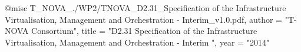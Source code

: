 @misc{ T_NOVA_./WP2/TNOVA_D2.31_Specification of the Infrastructure Virtualisation, Management and Orchestration - Interim_v1.0.pdf,
       author = "{T-NOVA Consortium}",
       title = "D2.31 Specification of the Infrastructure Virtualisation, Management and Orchestration - Interim ",
       year = "2014" }

